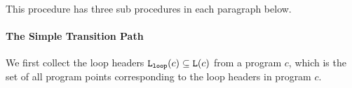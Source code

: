 This procedure has three sub procedures in each paragraph below.

\paragraph{The Simple Transition Path}
We first collect the loop headers $\mathtt{L}_{\mathtt{loop}}(c) \subseteq \mathtt{L}(c)$ from a program $c$, which is the set of all program points corresponding to the loop headers in program $c$.

